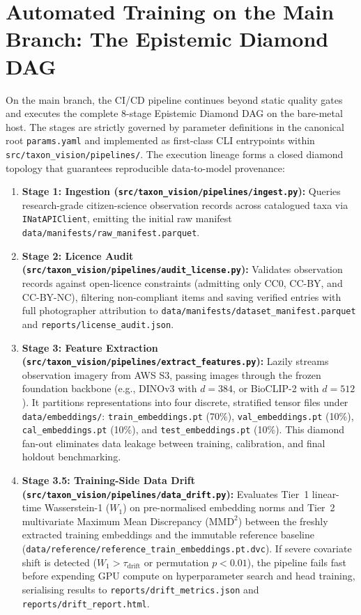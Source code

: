 \section{Automated Training on the Main Branch: The Epistemic Diamond DAG}
\label{sec:main_training}

On the main branch, the CI/CD pipeline continues beyond static quality gates and executes the complete 8-stage Epistemic Diamond DAG on the bare-metal host. The stages are strictly governed by parameter definitions in the canonical root \texttt{params.yaml} and implemented as first-class CLI entrypoints within \texttt{src/taxon\_vision/pipelines/}. The execution lineage forms a closed diamond topology that guarantees reproducible data-to-model provenance:
\begin{enumerate}
    \item \textbf{Stage 1: Ingestion (\texttt{src/taxon\_vision/pipelines/ingest.py}):} Queries research-grade citizen-science observation records across catalogued taxa via \texttt{INatAPIClient}, emitting the initial raw manifest \nolinkurl{data/manifests/raw_manifest.parquet}.
    \item \textbf{Stage 2: Licence Audit (\texttt{src/taxon\_vision/pipelines/audit\_license.py}):} Validates observation records against open-licence constraints (admitting only CC0, CC-BY, and CC-BY-NC), filtering non-compliant items and saving verified entries with full photographer attribution to \nolinkurl{data/manifests/dataset_manifest.parquet} and \nolinkurl{reports/license_audit.json}.
    \item \textbf{Stage 3: Feature Extraction (\texttt{src/taxon\_vision/pipelines/extract\_features.py}):} Lazily streams observation imagery from AWS S3, passing images through the frozen foundation backbone (e.g., DINOv3 with $d=384$, or BioCLIP-2 with $d=512$). It partitions representations into four discrete, stratified tensor files under \nolinkurl{data/embeddings/}: \nolinkurl{train_embeddings.pt} (70\%), \nolinkurl{val_embeddings.pt} (10\%), \nolinkurl{cal_embeddings.pt} (10\%), and \nolinkurl{test_embeddings.pt} (10\%). This diamond fan-out eliminates data leakage between training, calibration, and final holdout benchmarking.
    \item \textbf{Stage 3.5: Training-Side Data Drift (\texttt{src/taxon\_vision/pipelines/data\_drift.py}):} Evaluates Tier~1 linear-time Wasserstein-1 ($W_1$) on pre-normalised embedding norms and Tier~2 multivariate Maximum Mean Discrepancy ($\text{MMD}^2$) between the freshly extracted training embeddings and the immutable reference baseline (\nolinkurl{data/reference/reference_train_embeddings.pt.dvc}). If severe covariate shift is detected ($W_1 > \tau_{\text{drift}}$ or permutation $p < 0.01$), the pipeline fails fast before expending GPU compute on hyperparameter search and head training, serialising results to \nolinkurl{reports/drift_metrics.json} and \nolinkurl{reports/drift_report.html}.

\end{enumerate}
